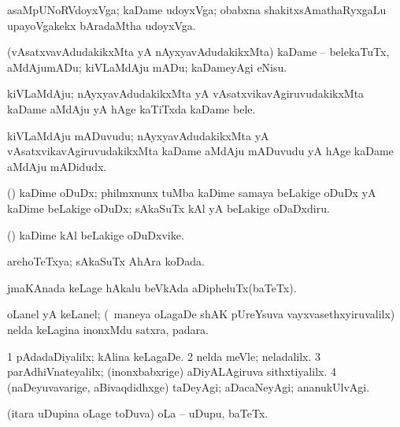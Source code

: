 {\bentry
{} 
\gl{\nA}
\bmng
 asaMpUNoRVdoyxVga; kaDame udoyxVga; obabxna shakitxsAmathaRyxgaLu upayoVgakekx bAradaMtha udoyxVga. 
\emng
\eentry

\bentry
{} 
\gl{\sakirx}
\expl{}
\bmng
 (vAsatxvavAdudakikxMta yA nAyxyavAdudakikxMta) kaDame -- belekaTuTx, aMdAjumADu; kiVLaMdAju mADu; kaDameyAgi eNisu. 
\emng
\eentry

\bentry
{} 
\gl{\nA}
\expl{}
\bmng
 kiVLaMdAju; nAyxyavAdudakikxMta yA vAsatxvikavAgiruvudakikxMta kaDame aMdAju yA hAge kaTiTxda kaDame bele. 
\emng
\eentry

\bentry
{} 
\gl{\nA}
\expl{}
\bmng
 kiVLaMdAju mADuvudu; nAyxyavAdudakikxMta yA vAsatxvikavAgiruvudakikxMta kaDame aMdAju mADuvudu yA hAge kaDame aMdAju mADidudx. 
\emng
\eentry

\bentry
{} 
\gl{\sakirx}
\expl{}
\bmng
 (\CA) kaDime oDuDx; philmxnunx tuMba kaDime samaya beLakige oDuDx yA kaDime beLakige oDuDx; sAkaSuTx kAl yA beLakige oDaDxdiru. 
\emng
\eentry

\bentry
{} 
\gl{\nA}
\expl{}
\bmng
 (\CA) kaDime kAl beLakige oDuDxvike. 
\emng
\eentry

\bentry
{} 
\gl{\gu}
\expl{}
\bmng
 arehoTeTxya; sAkaSuTx AhAra koDada. 
\emng
\eentry

\bentry
{} 
\gl{\nA}
\expl{}
\bmng
 jmaKAnada keLage hAkalu beVkAda aDipheluTx(baTeTx). 
\emng
\eentry

\bentry
{} 
\gl{\nA}
\expl{}
\bmng
 oLanel yA keLanel; (\kanmu\ maneya oLagaDe shAK pUreYsuva vayxvasethxyiruvalilx) nelda keLagina inonxMdu satxra, padara. 
\emng
\eentry

\bentry
{} 
\gl{\nA}
\expl{}
\bmng
\emng
\eentry

\bentry
{} 
\gl{\kirxvi}
\expl{}
\bmng
\bnum
\num{1} pAdadaDiyalilx; kAlina keLagaDe. 
\num{2} nelda meVle; neladalilx. 
\num{3} parAdhiVnateyalilx; (inonxbabxrige) aDiyALAgiruva sithxtiyalilx. 
\num{4} (naDeyuvavarige, aBivaqdidhxge) taDeyAgi; aDacaNeyAgi; ananukUlvAgi. 
\enum
\emng
\eentry

\bentry
{} 
\gl{\nA}
\expl{}
\bmng
 (itara uDupina oLage toDuva) oLa -- uDupu, baTeTx. 
\emng
\eentry

}

